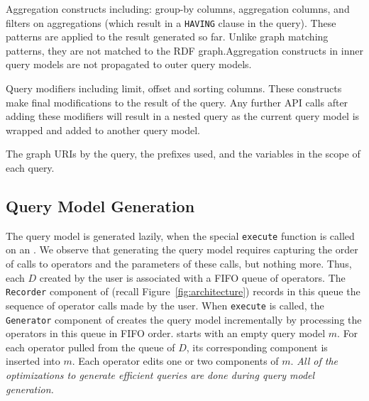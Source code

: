 \item
Aggregation constructs including: group-by columns, aggregation columns, and filters on aggregations (which result in a \texttt{HAVING} clause in the \sparql query). These patterns are applied to the result \rdfframe generated so far. Unlike graph matching patterns, they are not matched to the RDF graph.Aggregation constructs in inner query models are not propagated to outer query models.

\item
Query modifiers including limit, offset and sorting columns.
These constructs make final modifications to the result of the query. Any further API calls after adding these modifiers will result in a nested query as the current query model is wrapped and added to another query model. %

\item
The graph URIs by the query, the prefixes used, and the variables in the scope of each query.

\squishend

\vspace*{-9pt}
\subsection{Query Model Generation}

\vspace*{-2pt}

The query model is generated lazily, when the special \texttt{execute} function is called
on an \rdfframe.
We observe that generating the query model requires capturing the order of calls to \rdfframes operators and the parameters of these calls, but nothing more.
Thus, each \rdfframe $D$ created by the user is associated with a FIFO queue of operators.
The \texttt{Recorder} component of \rdfframes (recall Figure~\ref{fig:architecture})
records in this queue the sequence of operator calls made by the user.
When \texttt{execute} is called, the \texttt{Generator} component of \rdfframes creates the query model incrementally by processing the operators in this queue in FIFO order.
\rdfframes starts with an empty query model $m$. For each operator pulled from the queue of $D$, its corresponding \sparql component is inserted into $m$. 
Each \rdfframes operator edits one or two components of $m$.
\textit{All of the optimizations to generate efficient \sparql queries are done during query model generation.}

